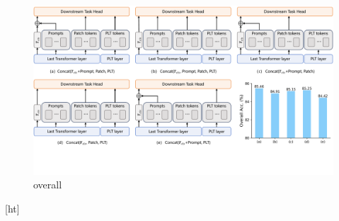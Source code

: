 \begin{figure}
    \centering
    \includegraphics[width=\linewidth]{fig/Effect of different inputs for downstream task head.pdf}
    \caption{overall}
    \label{fig:whole}
\end{figure}[ht]